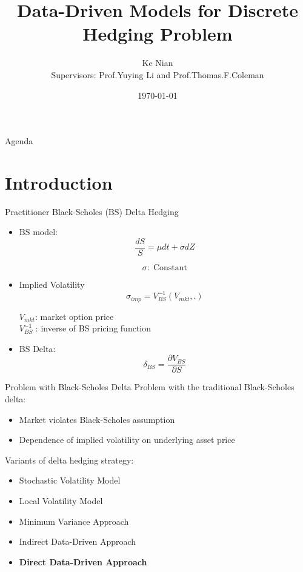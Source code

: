 \documentclass[10pt,table,mathserif]{beamer}
\title[Data-Driven Models for Discrete
Hedging Problem ]%
{Data-Driven Models for   Discrete
Hedging Problem}
\author[Ke Nian ] %
{ Ke Nian\\
 Supervisors: Prof.Yuying Li and Prof.Thomas.F.Coleman
}
\institute[
  David R. Cheriton School of Computer Science, University of Waterloo
] %
{%
  David R. Cheriton School of Computer Science,\\
  University of Waterloo,\\
  Waterloo, Canada
}
\date{\today}
\begin{document}
\begin{frame}[plain] %
  \titlepage
\end{frame}

\begin{frame}{Agenda}{}
\tableofcontents
\end{frame}

\section{Introduction}

\begin{frame}{Practitioner Black-Scholes (BS) Delta Hedging}

\begin{itemize}
  \item BS model:
\[
\frac{d S}{ S}= \mu dt +\sigma dZ
\]

\[
\sigma:\; \text{Constant}
\]
\item Implied Volatility
  \[
  \sigma_{imp}=V_{BS}^{-1}(V_{mkt},.)
  \]
  \begin{center}
  $V_{mkt}$: market option price \\ $V_{BS}^{-1}$ : inverse of BS pricing function
  \end{center}

\item BS Delta:
\[
\delta_{BS}=\frac{\partial V_{BS}}{ \partial S}
\]
\end{itemize}

\end{frame}






\begin{frame}{Problem with Black-Scholes Delta}
Problem with the traditional Black-Scholes delta:
\begin{itemize}
  \item Market violates Black-Scholes assumption
  \item Dependence of implied volatility on underlying asset price
\end{itemize}
Variants of delta hedging strategy:
\begin{itemize}
  \item Stochastic Volatility Model
  \item Local Volatility Model
  \item Minimum Variance Approach
  \item Indirect Data-Driven Approach
  \item \textbf{Direct Data-Driven Approach}
\end{itemize}
\end{frame}
\end{document}
